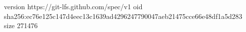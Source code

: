 version https://git-lfs.github.com/spec/v1
oid sha256:ec76e125c147d4eec13c1639ad4296247790047aeb21475cce66e48df1a5d283
size 271476
